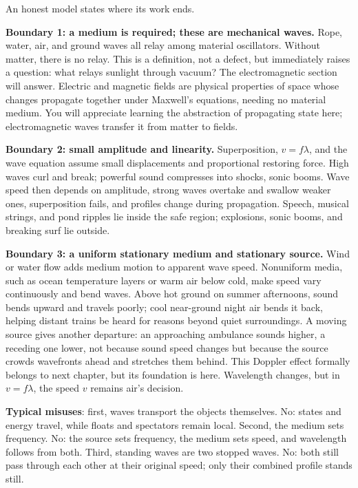 
\begin{mainline}
An honest model states where its work ends.

\textbf{Boundary 1: a medium is required; these are mechanical waves.} Rope, water, air, and ground waves all relay among material oscillators. Without matter, there is no relay. This is a definition, not a defect, but immediately raises a question: what relays sunlight through vacuum? The electromagnetic section will answer. Electric and magnetic fields are physical properties of space whose changes propagate together under Maxwell's equations, needing no material medium. You will appreciate learning the abstraction of propagating state here; electromagnetic waves transfer it from matter to fields.

\textbf{Boundary 2: small amplitude and linearity.} Superposition, \(v=f\lambda\), and the wave equation assume small displacements and proportional restoring force. High waves curl and break; powerful sound compresses into shocks, sonic booms. Wave speed then depends on amplitude, strong waves overtake and swallow weaker ones, superposition fails, and profiles change during propagation. Speech, musical strings, and pond ripples lie inside the safe region; explosions, sonic booms, and breaking surf lie outside.

\textbf{Boundary 3: a uniform stationary medium and stationary source.} Wind or water flow adds medium motion to apparent wave speed. Nonuniform media, such as ocean temperature layers or warm air below cold, make speed vary continuously and bend waves. Above hot ground on summer afternoons, sound bends upward and travels poorly; cool near-ground night air bends it back, helping distant trains be heard for reasons beyond quiet surroundings. A moving source gives another departure: an approaching ambulance sounds higher, a receding one lower, not because sound speed changes but because the source crowds wavefronts ahead and stretches them behind. This Doppler effect formally belongs to next chapter, but its foundation is here. Wavelength changes, but in \(v=f\lambda\), the speed \(v\) remains air's decision.

\textbf{Typical misuses}: first, waves transport the objects themselves. No: states and energy travel, while floats and spectators remain local. Second, the medium sets frequency. No: the source sets frequency, the medium sets speed, and wavelength follows from both. Third, standing waves are two stopped waves. No: both still pass through each other at their original speed; only their combined profile stands still.
\end{mainline}


